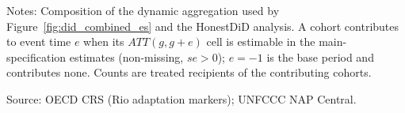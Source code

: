 \begin{table}[H]
\centering
\caption{Cohorts contributing to each event time in the main event study}
\label{tab:cohort_contributions}
\begingroup\small
{}
\endgroup
\par\vspace{4pt}
\begin{minipage}{\linewidth}\footnotesize
Notes: Composition of the dynamic aggregation used by Figure~\ref{fig:did_combined_es} and the HonestDiD analysis. A cohort contributes to event time $e$ when its $ATT(g, g+e)$ cell is estimable in the main-specification estimates (non-missing, $se > 0$); $e = -1$ is the base period and contributes none. Counts are treated recipients of the contributing cohorts.\par
Source: OECD CRS (Rio adaptation markers); UNFCCC NAP Central.
\end{minipage}
\end{table}
